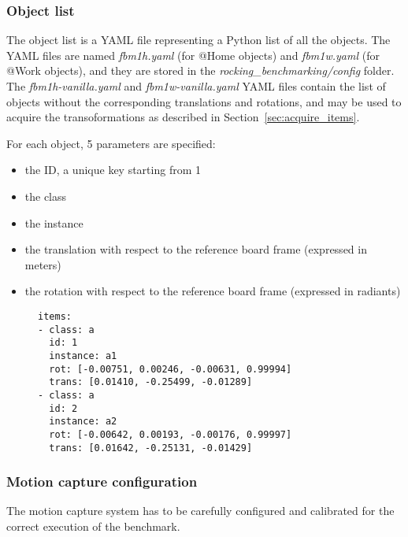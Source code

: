 \documentclass[a4paper]{article}
\begin{document}
\clearpage

\subsubsection{Object list}

The object list is a YAML file representing a Python list of all the objects.
The YAML files are named \emph{fbm1h.yaml} (for @Home objects) and \emph{fbm1w.yaml} (for @Work objects), and they are stored in the \emph{rocking\_benchmarking/config} folder.
The \emph{fbm1h-vanilla.yaml} and \emph{fbm1w-vanilla.yaml} YAML files contain the list of objects without the corresponding translations and rotations, and may be used to acquire the transoformations as described in Section~\ref{sec:acquire_items}.

For each object, 5 parameters are specified:

\begin{itemize}
  \item the ID, a unique key starting from 1
  \item the class
  \item the instance
  \item the translation with respect to the reference board frame (expressed in meters)
  \item the rotation with respect to the reference board frame (expressed in radiants)
\end{itemize}

\begin{figure}[h!]
	\noindent
	\begin{minipage}[t!]{\linewidth}
		\begin{lstlisting}[caption=fbm1h.yaml]
items:
- class: a
  id: 1
  instance: a1
  rot: [-0.00751, 0.00246, -0.00631, 0.99994]
  trans: [0.01410, -0.25499, -0.01289]
- class: a
  id: 2
  instance: a2
  rot: [-0.00642, 0.00193, -0.00176, 0.99997]
  trans: [0.01642, -0.25131, -0.01429]
    \end{lstlisting}
	\end{minipage}
\end{figure}

\subsubsection{Motion capture configuration}

The motion capture system has to be carefully configured and calibrated for the correct execution of the benchmark.
\end{document}
